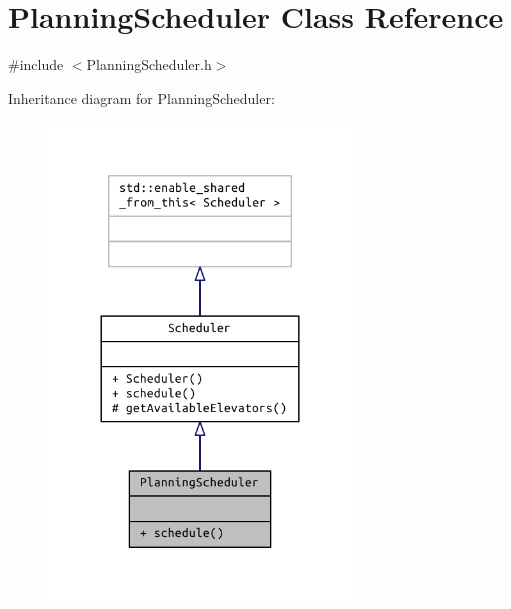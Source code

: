 \hypertarget{class_planning_scheduler}{}\section{Planning\+Scheduler Class Reference}
\label{class_planning_scheduler}


{\ttfamily \#include $<$Planning\+Scheduler.\+h$>$}



Inheritance diagram for Planning\+Scheduler\+:
\nopagebreak
\begin{figure}[H]
\begin{center}
\leavevmode
\includegraphics[width=228pt]{class_planning_scheduler__inherit__graph}
\end{center}
\end{figure}


